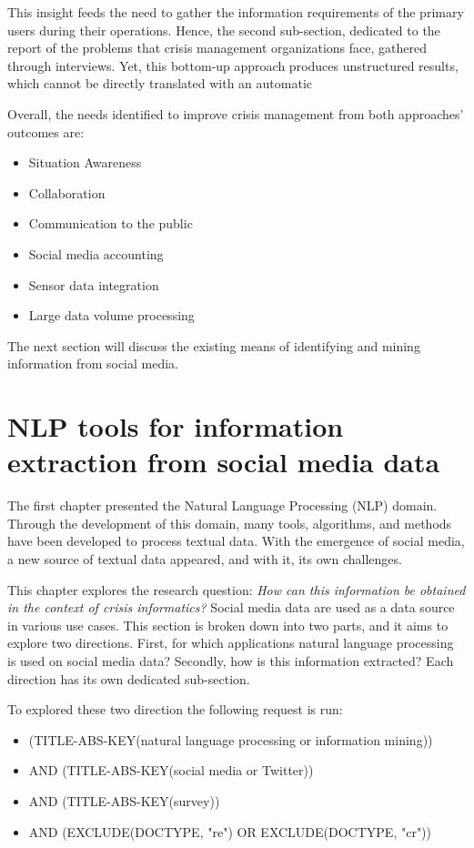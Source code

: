 This insight feeds the need to gather the information requirements of the primary users during their operations.
Hence, the second sub-section, dedicated to the report of the problems that crisis management organizations face, gathered through interviews.
Yet, this bottom-up approach produces unstructured results, which cannot be directly translated with an automatic

Overall, the needs identified to improve crisis management from both approaches' outcomes are:

\begin{itemize}
    \item Situation Awareness
    \item Collaboration
    \item Communication to the public
    \item Social media accounting
    \item Sensor data integration
    \item Large data volume processing
\end{itemize}

The next section will discuss the existing means of identifying and mining information from social media.

\section{NLP tools for information extraction from social media data}
The first chapter presented the Natural Language Processing (NLP) domain.
Through the development of this domain, many tools, algorithms, and methods have been developed to process textual data.
With the emergence of social media, a new source of textual data appeared, and with it, its own challenges.

This chapter explores the research question: \emph{How can this information be obtained in the context of crisis informatics?}
Social media data are used as a data source in various use cases.
This section is broken down into two parts, and it aims to explore two directions.
First, for which applications natural language processing is used on social media data?
Secondly, how is this information extracted?
Each direction has its own dedicated sub-section.

To explored these two direction the following request is run:

\begin{itemize}
    \item (TITLE-ABS-KEY({natural language processing} or {information mining}))
    \item AND (TITLE-ABS-KEY({social media} or Twitter))
    \item AND (TITLE-ABS-KEY(survey))
    \item AND (EXCLUDE(DOCTYPE, "re") OR EXCLUDE(DOCTYPE, "cr"))
\end{itemize}

